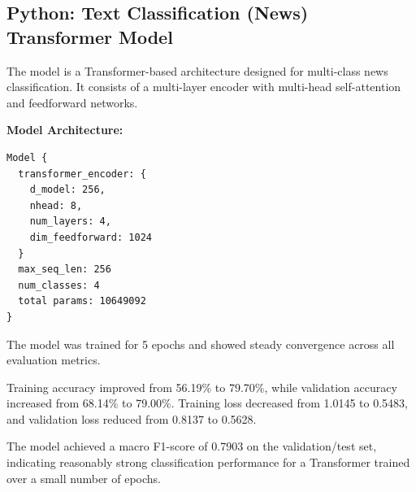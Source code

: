 \documentclass{ieeeaccess}
\begin{document}
\subsection{Python: Text Classification (News) Transformer Model}

The model is a Transformer-based architecture designed for multi-class news classification. It consists of a multi-layer encoder with multi-head self-attention and feedforward networks.

\textbf{Model Architecture:}

\begin{lstlisting}
Model {
  transformer_encoder: {
    d_model: 256,
    nhead: 8,
    num_layers: 4,
    dim_feedforward: 1024
  }
  max_seq_len: 256
  num_classes: 4
  total params: 10649092
}
\end{lstlisting}

The model was trained for 5 epochs and showed steady convergence across all evaluation metrics.

Training accuracy improved from 56.19\% to 79.70\%, while validation accuracy increased from 68.14\% to 79.00\%. 
Training loss decreased from 1.0145 to 0.5483, and validation loss reduced from 0.8137 to 0.5628.

The model achieved a macro F1-score of 0.7903 on the validation/test set, indicating reasonably strong classification performance for a Transformer trained over a small number of epochs.
\end{document}
